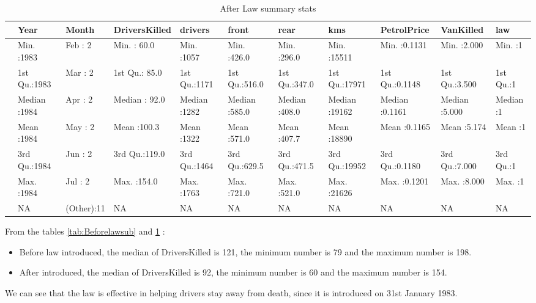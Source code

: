 \documentclass[11pt,a4paper,]{article}
\begin{document}
\begin{table}

\caption{\label{tab:Afterlawsub}After Law summary stats}
\centering
\begin{tabular}[t]{l|l|l|l|l|l|l|l|l|l|l}
\hline
  &      Year &     Month & DriversKilled &    drivers &     front &      rear &      kms &  PetrolPrice &   VanKilled &      law\\
\hline
 & Min.   :1983 & Feb    : 2 & Min.   : 60.0 & Min.   :1057 & Min.   :426.0 & Min.   :296.0 & Min.   :15511 & Min.   :0.1131 & Min.   :2.000 & Min.   :1\\
\hline
 & 1st Qu.:1983 & Mar    : 2 & 1st Qu.: 85.0 & 1st Qu.:1171 & 1st Qu.:516.0 & 1st Qu.:347.0 & 1st Qu.:17971 & 1st Qu.:0.1148 & 1st Qu.:3.500 & 1st Qu.:1\\
\hline
 & Median :1984 & Apr    : 2 & Median : 92.0 & Median :1282 & Median :585.0 & Median :408.0 & Median :19162 & Median :0.1161 & Median :5.000 & Median :1\\
\hline
 & Mean   :1984 & May    : 2 & Mean   :100.3 & Mean   :1322 & Mean   :571.0 & Mean   :407.7 & Mean   :18890 & Mean   :0.1165 & Mean   :5.174 & Mean   :1\\
\hline
 & 3rd Qu.:1984 & Jun    : 2 & 3rd Qu.:119.0 & 3rd Qu.:1464 & 3rd Qu.:629.5 & 3rd Qu.:471.5 & 3rd Qu.:19952 & 3rd Qu.:0.1180 & 3rd Qu.:7.000 & 3rd Qu.:1\\
\hline
 & Max.   :1984 & Jul    : 2 & Max.   :154.0 & Max.   :1763 & Max.   :721.0 & Max.   :521.0 & Max.   :21626 & Max.   :0.1201 & Max.   :8.000 & Max.   :1\\
\hline
 & NA & (Other):11 & NA & NA & NA & NA & NA & NA & NA & NA\\
\hline
\end{tabular}
\end{table}

From the tables \ref{tab:Beforelawsub} and \ref{tab:Afterlawsub} :

\begin{itemize}
\item
  Before law introduced, the median of DriversKilled is 121, the minimum number is 79 and the maximum number is 198.
\item
  After introduced, the median of DriversKilled is 92, the minimum number is 60 and the maximum number is 154.
\end{itemize}

We can see that the law is effective in helping drivers stay away from death, since it is introduced on 31st January 1983.
\end{document}
